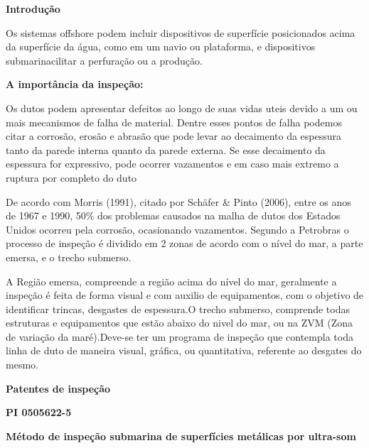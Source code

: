 \documentclass[a4paper,12pt]{article}
\begin{document}
	 
	
\hspace{-0,75cm}
\textbf{Introdução}
\vspace{1,0cm}


Os sistemas offshore podem incluir dispositivos de superfície
posicionados acima da superfície da água, como em um navio ou plataforma, e
dispositivos submarinacilitar a perfuração ou a produção.

\vspace{1,0cm}
\hspace{-0,75cm}
\textbf{A importância da inspeção:}
\vspace{1,0cm}

Os dutos podem apresentar defeitos ao longo de suas vidas uteis devido a um ou mais
mecanismos de falha de material. Dentre esses pontos de falha podemos citar a corrosão, erosão e
abrasão que pode levar ao decaimento da espessura tanto da parede interna quanto da parede externa.
Se esse decaimento da espessura for expressivo, pode ocorrer vazamentos e em caso mais extremo a
ruptura por completo do duto

De acordo com Morris (1991), citado por Schäfer \& Pinto (2006), entre os anos de 1967 e 1990,
50\% dos problemas causados na malha de dutos dos Estados Unidos ocorreu pela corrosão, ocasionando
vazamentos.
Segundo a Petrobras o processo de inspeção é dividido em 2 zonas de acordo com o nível do mar, a parte emersa, e o trecho submerso.

A Região emersa, compreende a região acima do nível do mar, geralmente a inspeção é feita de forma visual e com auxilio de equipamentos, com o objetivo de identificar trincas, desgastes de espessura.O trecho submerso, comprende todas estruturas e equipamentos que estão abaixo do nivel do mar, ou na ZVM (Zona de variação da maré).Deve-se ter um programa de inspeção que contempla toda linha de duto de maneira visual, gráfica, ou quantitativa, referente ao desgates do mesmo.

\vspace{1,0cm}
\hspace{-0,75cm}
 \textbf{Patentes de inspeção}
 
 \vspace{1,0cm}
 \begin{center}
  \textbf{PI 0505622-5} 
 
 \textbf{Método de inspeção submarina de superfícies metálicas por ultra-som}
 \end{center}
 
\end{document}

